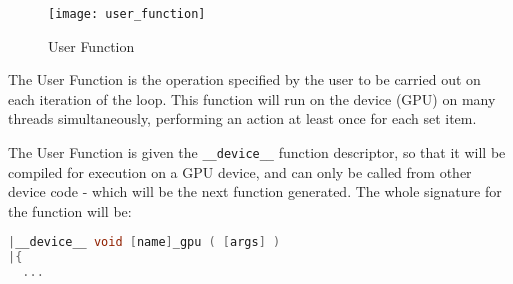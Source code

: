 \begin{wrapfigure}[13]{r}{.33\textwidth}
  \centering
  \caption{User Function}
  \label{fig:usr_func}
  \texttt{[image: user\_function]}
\end{wrapfigure}
The User Function is the operation specified by the user to be carried out on each iteration of the loop. This function will run on the device (GPU) on many threads simultaneously, performing an action at least once for each set item.
\par
The User Function is given the \verb|__device__| function  descriptor, so that it will be compiled for execution on a GPU device, and can only be called from other device code - which will be the next function generated. The whole signature for the function will be:
\begin{lstlisting}[language=C, backgroundcolor=\color{red!20}]
|__device__ void [name]_gpu ( [args] )
|{
  ...
\end{lstlisting}

